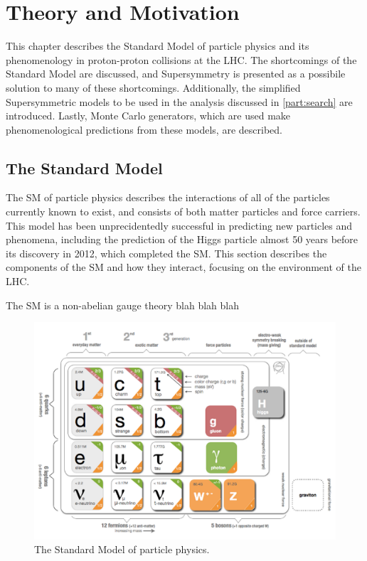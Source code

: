 
\chapter{Theory and Motivation} %

\label{ch:theory} %
This chapter describes the Standard Model of particle physics and its phenomenology in proton-proton collisions at the \ac{LHC}. The shortcomings of the Standard Model are discussed, and Supersymmetry is presented as a possibile solution to many of these shortcomings. Additionally, the simplified Supersymmetric models to be used in the analysis discussed in \autoref{part:search} are introduced. Lastly, Monte Carlo generators, which are used make phenomenological predictions from these models, are described. 


\section{The Standard Model}
\label{sec:standard_model}
The \ac{SM} of particle physics describes the interactions of all of the particles currently known to exist, and consists of both matter particles and force carriers. This model has been unprecidentedly successful in predicting new particles and phenomena, including the prediction of the Higgs particle almost 50 years before its discovery in 2012, which completed the \ac{SM}. This section describes the components of the \ac{SM} and how they interact, focusing on the environment of the \ac{LHC}. 

The \ac{SM} is a non-abelian gauge theory blah blah blah

\begin{centering}
\begin{figure}[bth]
\myfloatalign
\includegraphics[width=.85\linewidth]{figures/theory/standardmodel.png}
\caption{The Standard Model of particle physics. \cite{Galbraith:2012}}
\label{fig:sm}
\end{figure}
\end{centering}

